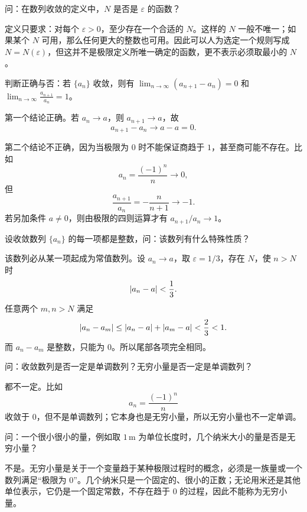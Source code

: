 \begin{xthought}[2]
问：在数列收敛的定义中，$N$ 是否是 $\varepsilon$ 的函数？
\end{xthought}
\begin{xsolution}
定义只要求：对每个 $\varepsilon>0$，至少存在一个合适的 $N$。这样的 $N$ 一般不唯一；如果某个 $N$ 可用，那么任何更大的整数也可用。因此可以人为选定一个规则写成 $N=N(\varepsilon)$，但这并不是极限定义所唯一确定的函数，更不表示必须取最小的 $N$。
\end{xsolution}


\begin{xthought}[3]
判断正确与否：若 $\{a_n\}$ 收敛，则有 $\displaystyle\lim_{n\to\infty}(a_{n+1}-a_n)=0$ 和 $\displaystyle\lim_{n\to\infty}\frac{a_{n+1}}{a_n}=1$。
\end{xthought}
\begin{xsolution}
第一个结论正确。若 $a_n\to a$，则 $a_{n+1}\to a$，故
\[
  a_{n+1}-a_n\to a-a=0.
\]

第二个结论不正确，因为当极限为 $0$ 时不能保证商趋于 $1$，甚至商可能不存在。比如
\[
  a_n=\frac{(-1)^n}{n}\to0,
\]
但
\[
  \frac{a_{n+1}}{a_n}=-\frac{n}{n+1}\to-1.
\]
若另加条件 $a\ne0$，则由极限的四则运算才有 $a_{n+1}/a_n\to1$。
\end{xsolution}


\begin{xthought}[4]
设收敛数列 $\{a_n\}$ 的每一项都是整数，问：该数列有什么特殊性质？
\end{xthought}
\begin{xsolution}
该数列必从某一项起成为常值数列。设 $a_n\to a$，取 $\varepsilon=1/3$，存在 $N$，使 $n>N$ 时
\[
  \lvert a_n-a\rvert<\frac13.
\]
任意两个 $m,n>N$ 满足
\[
  \lvert a_n-a_m\rvert\le\lvert a_n-a\rvert+\lvert a_m-a\rvert<\frac23<1.
\]
而 $a_n-a_m$ 是整数，只能为 $0$。所以尾部各项完全相同。
\end{xsolution}


\begin{xthought}[5]
问：收敛数列是否一定是单调数列？无穷小量是否一定是单调数列？
\end{xthought}
\begin{xsolution}
都不一定。比如
\[
  a_n=\frac{(-1)^n}{n}
\]
收敛于 $0$，但不是单调数列；它本身也是无穷小量，所以无穷小量也不一定单调。
\end{xsolution}


\begin{xthought}[6]
问：一个很小很小的量，例如取 $1\,\mathrm{m}$ 为单位长度时，几个纳米大小的量是否是无穷小量？
\end{xthought}
\begin{xsolution}
不是。无穷小量是关于一个变量趋于某种极限过程时的概念，必须是一族量或一个数列满足“极限为 $0$”。几个纳米只是一个固定的、很小的正数；无论用米还是其他单位表示，它仍是一个固定常数，不存在趋于 $0$ 的过程，因此不能称为无穷小量。
\end{xsolution}


